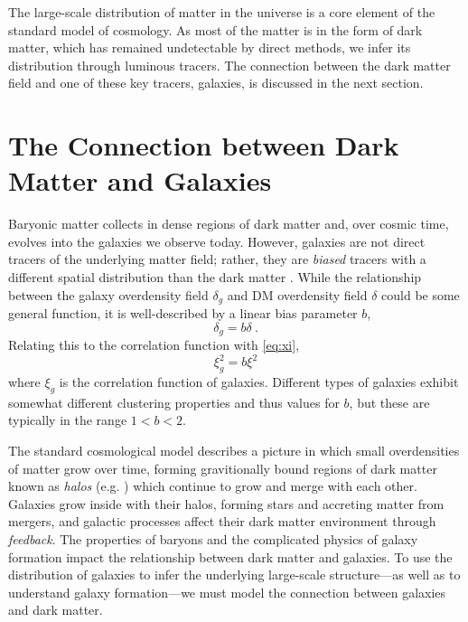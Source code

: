 The large-scale distribution of matter in the universe is a core element of the standard model of cosmology.
As most of the matter is in the form of dark matter, which has remained undetectable by direct methods, we infer its distribution through luminous tracers.
The connection between the dark matter field and one of these key tracers, galaxies, is discussed in the next section.


\section{The Connection between Dark Matter and Galaxies}

Baryonic matter collects in dense regions of dark matter and, over cosmic time, evolves into the galaxies we observe today.
However, galaxies are not direct tracers of the underlying matter field; rather, they are \emph{biased} tracers with a different spatial distribution than the dark matter \citep{kaiser_spatial_1984}.
While the relationship between the galaxy overdensity field $\delta_g$ and DM overdensity field $\delta$ could be some general function, it is well-described by a linear bias parameter $b$,
\begin{equation}
    \delta_g = b \delta ~.
\end{equation}
Relating this to the correlation function with \eqref{eq:xi}, 
\begin{equation}
    \xi_g^2 = b \xi^2
\end{equation}
where $\xi_g$ is the correlation function of galaxies.
Different types of galaxies exhibit somewhat different clustering properties and thus values for $b$, but these are typically in the range $1<b<2$.

The standard cosmological model describes a picture in which small overdensities of matter grow over time, forming gravitionally bound regions of dark matter known as \emph{halos} (e.g. \citealt{bryan_statistical_1998}) which continue to grow and merge with each other.
Galaxies grow inside with their halos, forming stars and accreting matter from mergers, and galactic processes affect their dark matter environment through \emph{feedback}. 
The properties of baryons and the complicated physics of galaxy formation impact the relationship between dark matter and galaxies.
To use the distribution of galaxies to infer the underlying large-scale structure---as well as to understand galaxy formation---we must model the connection between galaxies and dark matter.

